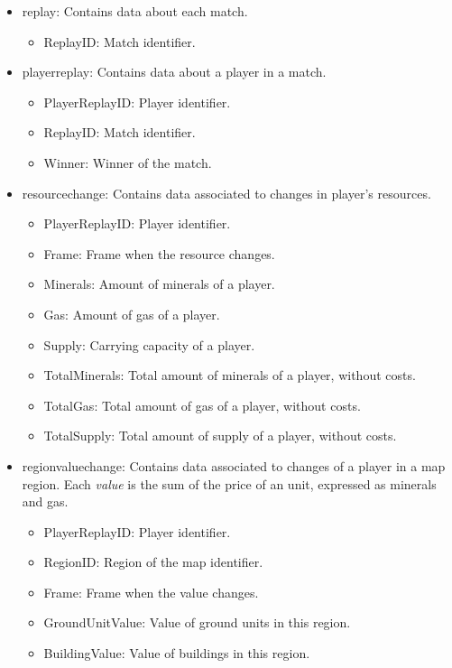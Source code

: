 \documentclass[a4paper,twoside]{article}\usepackage[]{graphicx}\usepackage[]{color}
\begin{document}
\begin{itemize}
  \item replay: Contains data about each match.
  \begin{itemize}
    \item ReplayID: Match identifier.
  \end{itemize}
  \item playerreplay: Contains data about a player in a match.
  \begin{itemize}
    \item PlayerReplayID: Player identifier.
    \item ReplayID: Match identifier.
    \item Winner: Winner of the match.
  \end{itemize}
  \item resourcechange: Contains data associated to changes in player's resources.
  \begin{itemize}
    \item PlayerReplayID: Player identifier.
    \item Frame: Frame when the resource changes.
    \item Minerals: Amount of minerals of a player.
    \item Gas: Amount of gas of a player.
    \item Supply: Carrying capacity of a player.
    \item TotalMinerals: Total amount of minerals of a player, without costs.
    \item TotalGas: Total amount of gas of a player, without costs.
    \item TotalSupply: Total amount of supply of a player, without costs.
  \end{itemize}
  \item regionvaluechange: Contains data associated to changes of a
  player in a map region. Each \emph{value} is the sum of the price of an unit,
  expressed as minerals and gas.
  \begin{itemize}
    \item PlayerReplayID: Player identifier.
    \item RegionID: Region of the map identifier.
    \item Frame: Frame when the value changes.
    \item GroundUnitValue: Value of ground units in this region.
    \item BuildingValue: Value of buildings in this region.

\end{itemize}
\end{itemize}
\end{document}
